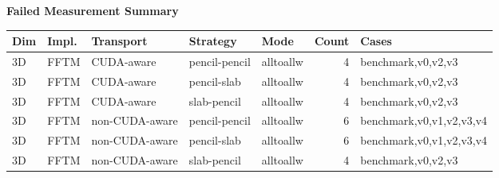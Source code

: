 \documentclass{article}
\begin{document}
\begin{center}
{\fontsize{8.0pt}{9.4pt}\selectfont
\textbf{Failed Measurement Summary}

\vspace{0.6em}
\begin{tabular}{lllllrl}
\hline
Dim & Impl. & Transport & Strategy & Mode & Count & Cases \\
\hline
3D & FFTM & CUDA-aware & pencil-pencil & alltoallw & 4 & benchmark,v0,v2,v3 \\
3D & FFTM & CUDA-aware & pencil-slab & alltoallw & 4 & benchmark,v0,v2,v3 \\
3D & FFTM & CUDA-aware & slab-pencil & alltoallw & 4 & benchmark,v0,v2,v3 \\
3D & FFTM & non-CUDA-aware & pencil-pencil & alltoallw & 6 & benchmark,v0,v1,v2,v3,v4 \\
3D & FFTM & non-CUDA-aware & pencil-slab & alltoallw & 6 & benchmark,v0,v1,v2,v3,v4 \\
3D & FFTM & non-CUDA-aware & slab-pencil & alltoallw & 4 & benchmark,v0,v2,v3 \\
\hline
\end{tabular}
}
\end{center}
\end{document}
